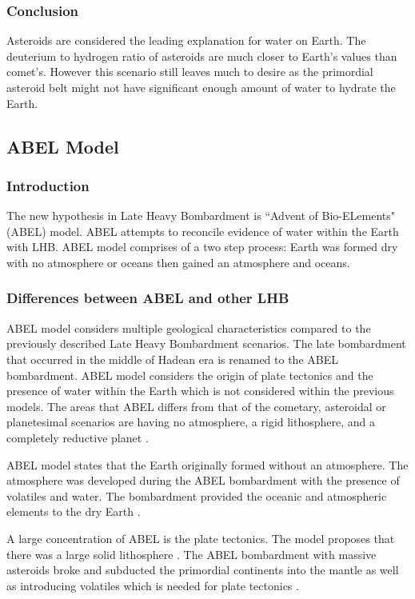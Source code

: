 \documentclass{article}
\begin{document}
\subsubsection{Conclusion}
Asteroids are considered the leading explanation for water on Earth. 
The deuterium to hydrogen ratio of asteroids are much closer to Earth's values than comet's. 
However this scenario still leaves much to desire as the primordial asteroid belt might not have significant enough amount of water to hydrate the Earth.

\subsection{ABEL Model}
\subsubsection{Introduction}
The new hypothesis in Late Heavy Bombardment is ``Advent of Bio-ELements" (ABEL) model\cite{ABEL_1}. 
ABEL attempts to reconcile evidence of water within the Earth with LHB. ABEL model comprises of a two step process: Earth was formed dry with no atmosphere or oceans then gained an atmosphere and oceans. 

\subsubsection{Differences between ABEL and other LHB}
ABEL model considers multiple geological characteristics compared to the previously described Late Heavy Bombardment scenarios. 
The late bombardment that occurred in the middle of Hadean era is renamed to the ABEL bombardment.
ABEL model considers the origin of plate tectonics and the presence of water within the Earth which is not considered within the previous models. 
The areas that ABEL differs from that of the cometary, asteroidal or planetesimal scenarios are having no atmosphere, a rigid lithosphere, and a completely reductive planet \cite{ABEL_1}.

ABEL model states that the Earth originally formed without an atmosphere. The atmosphere was developed during the ABEL bombardment with the presence of volatiles and water. The bombardment provided the oceanic and atmospheric elements to the dry Earth \cite{ABEL_2}.

A large concentration of ABEL is the plate tectonics. The model proposes that there was a large solid lithosphere \cite{ABEL_2}. The ABEL bombardment with massive asteroids broke and subducted the primordial continents into the mantle as well as  introducing volatiles which is needed for plate tectonics \cite{ABEL_3}. 
\end{document}

